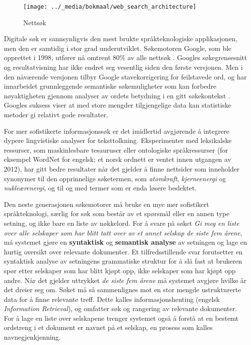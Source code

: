\begin{multicols}{2}
\begin{figure*}[htb]
  \center
  \texttt{[image: ../\_media/bokmaal/web\_search\_architecture]}
  \caption{Nettsøk}
  \label{fig:websearcharch_no}
 \end{figure*}

Digitale søk er sannsynligvis den mest brukte språkteknologiske applikasjonen, men den er samtidig i stor grad underutviklet. Søkemotoren Google, som ble opprettet i 1998, utfører nå omtrent 80\% av alle nettsøk \cite{spi1}. 
Googles søkegrensesnitt og resultatvisning har ikke endret seg vesentlig siden den første versjonen. Men i den nåværende versjonen tilbyr Google stavekorrigering for feilstavede ord, og har innarbeidet grunnleggende semantiske søkemuligheter som kan forbedre nøyaktigheten gjennom analyser av ordets betydning i en gitt søkekontekst \cite{pc1}. Googles suksess viser at med store mengder tilgjengelige data kan statistiske metoder gi relativt gode resultater.

For mer sofistikerte informasjonssøk er det imidlertid avgjørende å integrere dypere lingvistiske analyser for teksttolkning. Eksperimenter med leksikalske ressurser, som maskinlesbare tesauruser eller ontologiske språkressurser (for eksempel WordNet for engelsk; et norsk ordnett er ventet innen utgangen av 2012), har gitt bedre resultater når det gjelder å finne nettsider som inneholder synonymer til den opprinnelige søketermen, som 
\textit{atomkraft}, \textit{kjerneenergi} og \textit{nukleærenergi}, og til og med termer som er enda løsere beslektet.  


Den neste generasjonen søkemotorer må bruke en mye mer sofistikert språkteknologi, særlig for søk som består av et spørsmål eller en annen type setning, og ikke bare en liste av nøkkelord. For å svare på søket \textit{Gi meg en liste over alle selskaper som har blitt tatt over av et annet selskap de siste fem årene}, må systemet gjøre en \textbf{syntaktisk} og \textbf{semantisk analyse} av setningen og lage en hurtig oversikt over relevante dokumenter. Et tilfredsstillende svar forutsetter en syntaktisk analyse av setningens grammatiske struktur for å slå fast at brukeren spør etter selskaper som har blitt kjøpt opp, ikke selskaper som har kjøpt opp andre. Når det gjelder uttrykket \textit{de siste fem årene} må systemet avgjøre hvilke år det dreier seg om. Søket må så sammenlignes mot en stor mengde ustrukturerte data for å finne relevante treff. Dette kalles informasjonshenting (engelsk \textit{Information Retrieval}), og omfatter søk og rangering av relevante dokumenter. For å lage en liste over selskapene trenger systemet også å forstå at en bestemt ordstreng i et dokument er navnet på et selskap, en prosess som kalles navnegjenkjenning.


\end{multicols}
